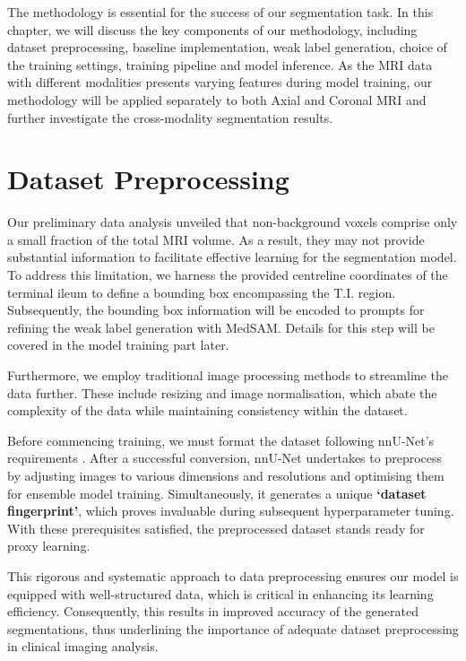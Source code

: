 The methodology is essential for the success of our segmentation task. In this chapter, we will discuss the key components of our methodology, including dataset preprocessing, baseline implementation, weak label generation, choice of the training settings, training pipeline and model inference. As the MRI data with different modalities presents varying features during model training, our methodology will be applied separately to both Axial and Coronal MRI and further investigate the cross-modality segmentation results. 

\section{Dataset Preprocessing}

Our preliminary data analysis unveiled that non-background voxels comprise only a small fraction of the total MRI volume. As a result, they may not provide substantial information to facilitate effective learning for the segmentation model. To address this limitation, we harness the provided centreline coordinates of the terminal ileum to define a bounding box encompassing the T.I. region. Subsequently, the bounding box information will be encoded to prompts for refining the weak label generation with MedSAM. Details for this step will be covered in the model training part later.

Furthermore, we employ traditional image processing methods to streamline the data further. These include resizing and image normalisation, which abate the complexity of the data while maintaining consistency within the dataset.

Before commencing training, we must format the dataset following nnU-Net's requirements \cite{isensee2021nnu}. After a successful conversion, nnU-Net undertakes to preprocess by adjusting images to various dimensions and resolutions and optimising them for ensemble model training. Simultaneously, it generates a unique \textbf{`dataset fingerprint'}, which proves invaluable during subsequent hyperparameter tuning. With these prerequisites satisfied, the preprocessed dataset stands ready for proxy learning.

This rigorous and systematic approach to data preprocessing ensures our model is equipped with well-structured data, which is critical in enhancing its learning efficiency. Consequently, this results in improved accuracy of the generated segmentations, thus underlining the importance of adequate dataset preprocessing in clinical imaging analysis.

